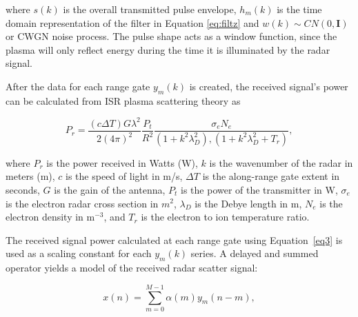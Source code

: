\noindent where $s(k)$ is the overall transmitted pulse envelope, $h_m(k)$ is the time domain representation of the filter in Equation \ref{eq:filtz} and $w(k)\sim CN(0,\mathbf{I})$ or CWGN noise process. The pulse shape acts as a window function, since the plasma will only reflect energy during the time it is illuminated by the radar signal. 

%

After the data for each range gate $y_m(k)$ is created, the received signal's power can be calculated from ISR plasma scattering theory as 

\begin{equation}
\label{eq3}
P_r = \frac{\left(c\Delta T\right) G \lambda^2}{2(4\pi)^2}\frac{P_t }{R^2}\frac{\sigma_e N_e}{(1+k^2\lambda_D^2),(1+k^2\lambda_D^2 + T_r)},
\end{equation}
 
 \noindent where $P_r$ is the power received in Watts (W), $k$ is the wavenumber of the radar in meters (m), $c$ is the speed of light in m/s, $\Delta T$ is the along-range gate extent in seconds, $G$ is the gain of the antenna, $P_t$ is the power of the transmitter in W, $\sigma_e$ is the electron radar cross section in $m^2$,  $\lambda_D$ is the Debye length in m, $N_e$ is the electron density in m$^{-3}$, and $T_r$ is the electron to ion temperature ratio.
  
The received signal power calculated at each range gate using Equation~\ref{eq3} is used as a scaling constant for each $y_m(k)$ series.  A delayed and summed operator yields a model of the received radar scatter signal:
 
\begin{equation}
\label{eq4}
x(n) = \displaystyle\sum\limits_{m =0}^{M-1} \alpha(m)y_m(n-m),
\end{equation}

